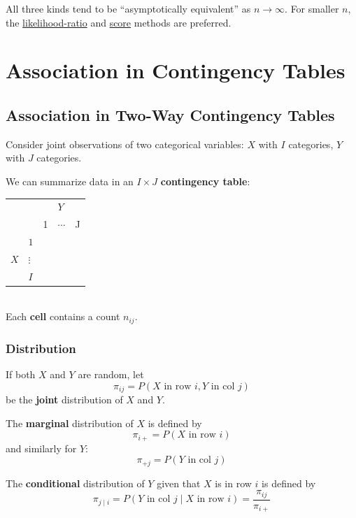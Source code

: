 \documentclass[11pt]{elegantbook}
\begin{document}
All three kinds tend to be “asymptotically equivalent” as $n \rightarrow \infty$. For smaller $n$, the \underline{likelihood-ratio} and \underline{score} methods are preferred.

\chapter{Association in Contingency Tables}
\section{Association in Two-Way Contingency Tables}
Consider joint observations of two categorical variables: $X$ with $I$ categories, $Y$ with $J$ categories.

We can summarize data in an $I \times J$ \textbf{contingency table}:
\begin{table}[htbp]
    \centering
    \begin{tabular}{lllll}
        &&&$Y$&\\
        &&1&$\cdots$&J\\
        \cline{3-5}
        & \multicolumn{1}{l|}{$1$} & \multicolumn{1}{l|}{} & \multicolumn{1}{l|}{} & \multicolumn{1}{l|}{} \\
        \cline{3-5}
        $X$ &\multicolumn{1}{l|}{$\vdots$}  & \multicolumn{1}{l|}{} & \multicolumn{1}{l|}{} & \multicolumn{1}{l|}{} \\ \cline{3-5}
        & \multicolumn{1}{l|}{$I$} & \multicolumn{1}{l|}{} & \multicolumn{1}{l|}{} & \multicolumn{1}{l|}{} \\ \cline{3-5}
    \end{tabular}
\end{table}\\
Each \textbf{cell} contains a count $n_{ij}$.

\subsection{Distribution}
If both $X$ and $Y$ are random, let $$\pi_{ij}=P(X\text{ in row }i, Y\text{ in col }j)$$
be the \textbf{joint} distribution of $X$ and $Y$.

The \textbf{marginal} distribution of $X$ is defined by $$\pi_{i+}=P(X\text{ in row }i)$$
and similarly for $Y$:
$$\pi_{+j}=P(Y\text{ in col }j)$$

The \textbf{conditional} distribution of $Y$ given that $X$ is in row $i$ is defined by
$$\pi_{j\mid i}=P(Y\text{ in col }j\mid X\text{ in row }i)=\frac{\pi_{ij}}{\pi_{i+}}$$
\end{document}

